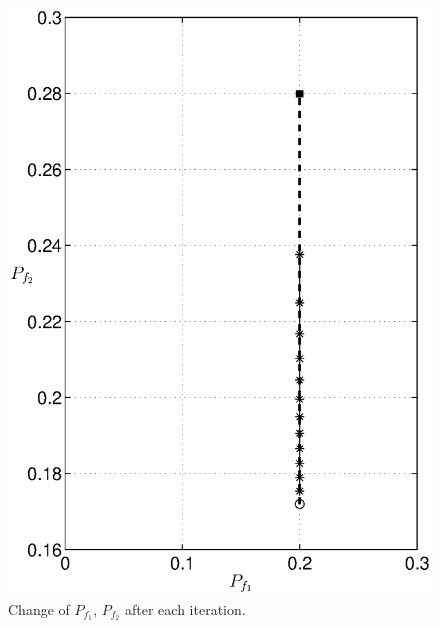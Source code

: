 \begin{figure}[H]
\centering
\includegraphics[width = 14cm]{2/24pf.eps}
\caption{Change of $P_{f_1}$, $P_{f_2}$ after each iteration.}
\label{fig: 2.4}
\end{figure}
\newpage
